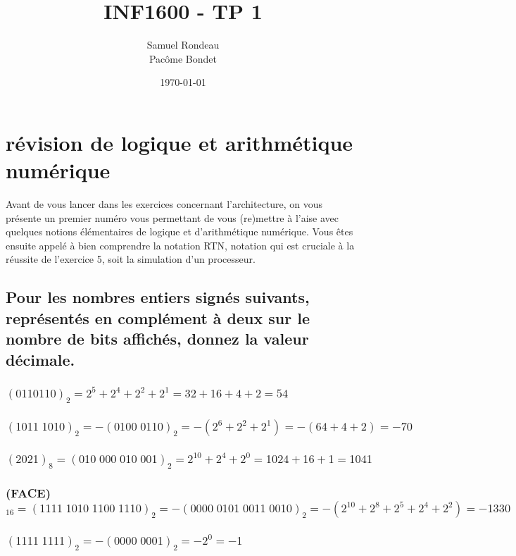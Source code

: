 \documentclass[10pt,letterpaper]{article}
\title{\vspace{-10mm}\Large
INF1600 - TP 1
\vspace{-4mm}}
\author{\large
Samuel Rondeau\\
Pacôme Bondet}
\date{\today}
\begin{document}
\maketitle

\section{révision de logique et arithmétique numérique}
Avant de vous lancer dans les exercices concernant l'architecture, on vous présente un premier numéro vous permettant de vous (re)mettre à l'aise avec quelques notions élémentaires de logique et d'arithmétique numérique. Vous êtes ensuite appelé à bien comprendre la notation RTN, notation qui est cruciale à la réussite de l'exercice 5, soit la simulation d'un processeur.
\bigskip

\subsection{Pour les nombres entiers signés suivants, représentés en complément à deux sur le nombre de bits affichés, donnez la valeur décimale.}
\subsubsection{$(0110110)_2 = 2^5 + 2^4 + 2^2 + 2^1 = 32 + 16 + 4 + 2 = 54$}

\subsubsection{$(1011\;1010)_2 = -(0100\;0110)_2 = -(2^6 + 2^2 + 2^1) = -(64 + 4 + 2) = -70$}

\subsubsection{$(2021)_8 = (010\;000\;010\;001)_2 = 2^{10} + 2^4 + 2^0 = 1024 + 16 + 1 = 1041$}

\subsubsection{(FACE)$_{16} = (1111\;1010\;1100\;1110)_2 = -(0000\;0101\;0011\;0010)_2 = -(2^{10} + 2^8 + 2^5 + 2^4 + 2^2) = -1330$}

\subsubsection{$(1111\;1111)_2 = -(0000\;0001)_2 = -2^0 = -1$}
\bigskip
\end{document}

